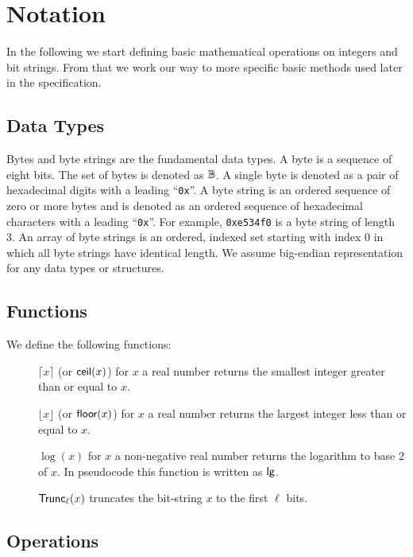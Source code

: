  
\section{Notation}


In the following we start defining basic mathematical operations on integers and bit strings. From that we work our way to more specific basic methods used later in the specification.

\subsection{Data Types}

Bytes and byte strings are the fundamental data types. A byte is a sequence of eight bits. The set of bytes is denoted as $\mathbb{B}$. A single byte is denoted as a pair of hexadecimal digits with a leading ``\texttt{0x}''. A byte string is an ordered sequence of zero or more bytes and is denoted as an ordered sequence of hexadecimal characters with a leading ``\texttt{0x}''. For example, \texttt{0xe534f0} is a byte string of length 3. An array of byte strings is an ordered, indexed set starting with index 0 in which all byte strings have identical length. We assume big-endian representation for any data types or structures.

\subsection{Functions}

We define the following functions:
\begin{description}
    \item[]$\lceil x \rceil$ (or $\textsf{ceil}(x)$) for $x$ a real number returns the smallest integer greater than or equal to $x$.
    \item[]$\lfloor x \rfloor$ (or $\textsf{floor}(x)$) for $x$ a real number returns the largest integer less than or equal to $x$.
    \item[]$\log(x)$ for $x$ a non-negative real number returns the logarithm to base 2 of $x$. In pseudocode this function is written as $\textsf{lg}$.
    \item[]$\textsf{Trunc}_\ell(x)$ truncates the bit-string $x$ to the first $\ell$ bits.
\end{description}

\subsection{Operations}

